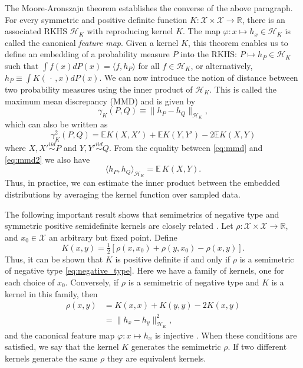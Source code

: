 \documentclass[aps,preprint,nofootinbib,floatfix]{revtex4-1}
\newcommand\E{\mathbb{E}}
\newcommand\kk{K}
\newcommand\kkk{h}
\newcommand\Hk{{\mathcal{H}}_{\kk}}
\begin{document}
The Moore-Aronszajn theorem 
\cite{Aronszajn}
establishes the converse of the above paragraph. 
For every symmetric
and positive definite function $\kk: \mathcal{X}\times \mathcal{X} \to
\mathbb{R}$, there is an associated RKHS $\Hk$ 
with reproducing
kernel $\kk$. The map $\varphi: x \mapsto \kkk_x \in \Hk$ is called
the canonical \emph{feature map}. Given a kernel $\kk$,
this theorem enables us to define an embedding of a probability measure
$P$ into the RKHS: $P \mapsto \kkk_P \in
\Hk$ such that 
$\int f(x) d P(x) = \langle f, \kkk_P \rangle$ for all $f \in \Hk$,
or alternatively, $\kkk_P \equiv \int \kk( \, \cdot \,, x)  d P(x)$. 
We can now  introduce the 
notion of distance between two probability measures using the inner product
of $\Hk$. This is called the maximum mean discrepancy (MMD) and
is given by
\begin{equation}\label{eq:mmd}
\gamma_\kk(P,Q) \equiv \| \kkk_P - \kkk_Q \|_{\Hk},
\end{equation}
which can also be written as \cite{Gretton2012}
\begin{equation}\label{eq:mmd2}
\gamma_\kk^2(P,Q) = \E \kk(X,X') + \E \kk(Y,Y') - 2 \E \kk(X, Y)
\end{equation}
where $X,X' \stackrel{iid}{\sim} P$ and $Y,Y'\stackrel{iid}{\sim} Q$.
From the equality between \eqref{eq:mmd} and \eqref{eq:mmd2} we also
have 
\begin{equation}\label{eq:inner_data}
\langle \kkk_P, \kkk_Q \rangle_{\Hk} = \E \, \kk(X, Y).
\end{equation}
Thus, in practice, we can estimate the inner product between the 
embedded distributions 
by averaging the kernel function over sampled data.

The following important result shows that semimetrics of negative
type and symmetric positive semidefinite kernels are closely related
\cite{Berg1984}. Let $\rho: \mathcal{X} \times \mathcal{X} \to \mathbb{R}$,
and $x_0 \in \mathcal{X}$ an arbitrary but fixed point.
Define
\begin{equation}
\label{eq:kernel_semimetric}
\kk(x,y) = \tfrac{1}{2} \left[  \rho(x,x_0) + \rho(y,x_0) - \rho(x,y)\right].
\end{equation}
Thus, it can be shown that 
$\kk$ is positive definite if and only if $\rho$ is a semimetric
of negative type
\eqref{eq:negative_type}.
Here we have a family of kernels, one for each choice of $x_0$. Conversely,
if $\rho$ is a semimetric of negative type and $\kk$ is a kernel in this
family, then 
\begin{equation}
\label{eq:gen_kernel}
\begin{split}
\rho(x,y) &= \kk(x,x) + \kk(y,y) -2\kk(x,y) \\
&=  \| \kkk_x - \kkk_y \|^2_{\Hk},
\end{split}
\end{equation}
and the canonical feature map 
$\varphi: x \mapsto \kkk_x$ is injective \cite{Sejdinovic2013}.
When these conditions are satisfied, we say that the kernel $\kk$ 
generates the semimetric $\rho$. 
If two different kernels generate the same $\rho$ they are
equivalent kernels.
\end{document}
